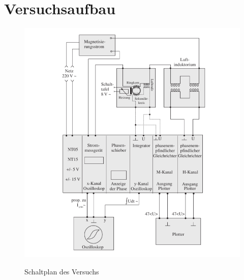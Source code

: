 \section{Versuchsaufbau}

    \begin{figure}[H]
        \centering
        \includegraphics{Images/Schaltplan.PNG}
        \label{Schaltplan}
        \caption{Schaltplan des Versuchs}
    \end{figure}

